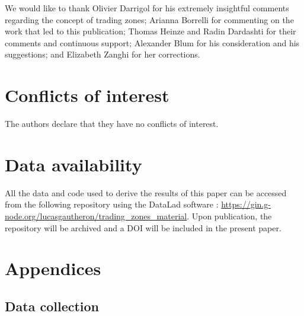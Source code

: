 \documentclass[smallextended]{svjour3}
\begin{document}
\printglossary[type=\acronymtype,title=List of abbreviations]




\begin{acknowledgements}
We would like to thank Olivier Darrigol for his extremely insightful comments regarding the concept of trading zones; Arianna Borrelli for commenting on the work that led to this publication; Thomas Heinze and  Radin Dardashti for their comments and continuous support; Alexander Blum for his consideration and his suggestions; and Elizabeth Zanghi for her corrections.
\end{acknowledgements}

\section*{Conflicts of interest}

The authors declare that they have no conflicts of interest.

\section*{Data availability}

All the data and code used to derive the results of this paper can be accessed from the following repository using the DataLad software \citep{datalad_paper}: \url{https://gin.g-node.org/lucasgautheron/trading_zones_material}. Upon publication, the repository will be archived and a DOI will be included in the present paper.




\appendix


\section{Appendices}
\label{section:appendix}

\subsection{Data collection}
\label{appendix:collection}
\end{document}
